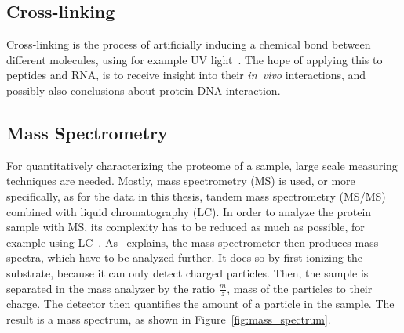 	\subsection{Cross-linking}
	\label{lab:background:cross-linking}
	Cross-linking is the process of artificially inducing a chemical bond between different molecules, using for example UV light~\cite{Sachsenberg2017}. The hope of applying this to peptides and RNA, is to receive insight into their \textit{in~vivo} interactions, and possibly also conclusions about protein-DNA interaction.\\
	\subsection{Mass Spectrometry}
	\label{lab:background:ms}
	For quantitatively characterizing the proteome of a sample, large scale measuring techniques are needed. Mostly, mass spectrometry (MS) is used, or more specifically, as for the data in this thesis, tandem mass spectrometry (MS/MS) combined with liquid chromatography (LC). In order to analyze the protein sample with MS, its complexity has to be reduced as much as possible, for example using LC~\cite{Sachsenberg2017}. As~\citet{Han2008} explains, the mass spectrometer then produces mass spectra, which have to be analyzed further. It does so by first ionizing the substrate, because it can only detect charged particles. Then, the sample is separated in the mass analyzer by the ratio $\frac{m}{z}$, mass of the particles to their charge. The detector then quantifies the amount of a particle in the sample. The result is a mass spectrum, as shown in Figure~\ref{fig:mass_spectrum}.\\
	\renewcommand{\baselinestretch}{0.9}

